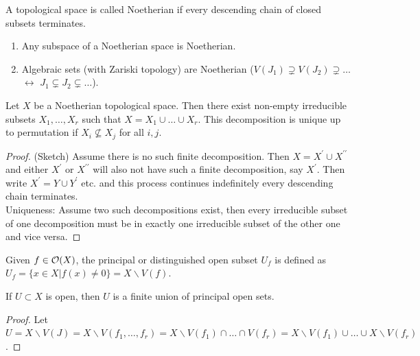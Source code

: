 \documentclass[a4paper,11pt]{article}
\begin{document}
			\begin{defi}
				A topological space is called Noetherian if every descending chain of closed subsets terminates.
			\end{defi}

			\begin{remark}
				\begin{enumerate}
					\item Any subspace of a Noetherian space is Noetherian.
					\item Algebraic sets (with Zariski topology) are Noetherian ($V(J_1)\supsetneq V(J_2)\supsetneq\dots$ $\longleftrightarrow$ $J_1\subsetneq J_2\subsetneq\dots$).
				\end{enumerate}
			\end{remark}

			\begin{prop}
				Let $X$ be a Noetherian topological space. Then there exist non-empty irreducible subsets $X_1,\dots,X_r$ such that $X=X_1\cup\dots\cup X_r$. This decomposition is unique up to permutation if $X_i\nsubseteq X_j$ for all $i,j$.
			\end{prop}
			\begin{proof}
				(Sketch) Assume there is no such finite decomposition. Then $X=X^\prime\cup X^{\prime\prime}$ and either $X^\prime$ or $X^{\prime\prime}$ will also not have such a finite decomposition, say $X^\prime$. Then write $X^\prime=Y\cup Y^\prime$ etc. and this process continues indefinitely \contradiction every descending chain terminates.\\
				Uniqueness: Assume two such decompositions exist, then every irreducible subset of one decomposition must be in exactly one irreducible subset of the other one and vice versa.
			\end{proof}

			\begin{defi}
				Given $f\in\mathcal{O}(X)$, the principal or distinguished open subset $U_f$ is defined as $U_f=\{x\in X|f(x)\neq0\}=X\backslash V(f)$.
			\end{defi}

			\begin{prop}\label{prop--principal-open}
				If $U\subset X$ is open, then $U$ is a finite union of principal open sets.
			\end{prop}
			\begin{proof}
				Let $U=X\backslash V(J)=X\backslash V(f_1,\dots,f_r)=X\backslash V(f_1)\cap\dots\cap V(f_r)=X\backslash V(f_1)\cup\dots\cup X\backslash V(f_r)$.
			\end{proof}
\end{document}
